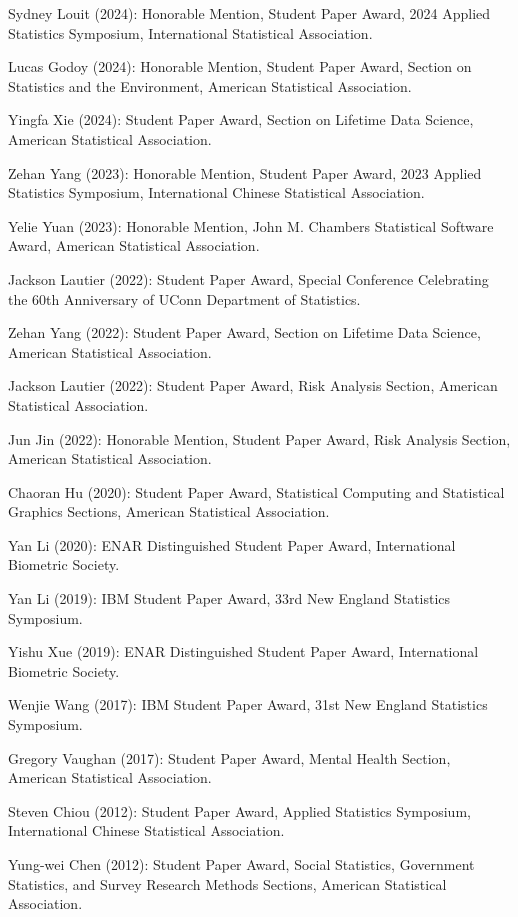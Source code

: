 \documentclass[Statistics]{vita}
\begin{document}
\begin{vita}
\begin{TeachingAccomplishments}
\begin{StudentAwards}
    \item Sydney Louit (2024): Honorable Mention, Student Paper Award, 2024 Applied Statistics Symposium, International Statistical Association.
    \item Lucas Godoy (2024): Honorable Mention, Student Paper Award, Section on Statistics and the Environment, American Statistical Association.
    \item Yingfa Xie (2024): Student Paper Award, Section on Lifetime Data Science, American Statistical Association.
    \item Zehan Yang (2023): Honorable Mention, Student Paper Award, 2023 Applied Statistics Symposium, International Chinese Statistical Association.
    \item Yelie Yuan (2023): Honorable Mention, John M. Chambers Statistical Software Award, American Statistical Association.
    \item Jackson Lautier (2022): Student Paper Award, Special Conference Celebrating the 60th Anniversary of UConn Department of Statistics.
    \item Zehan Yang (2022): Student Paper Award, Section on Lifetime Data Science, American Statistical Association.
    \item Jackson Lautier (2022): Student Paper Award, Risk Analysis Section, American Statistical Association.
    \item Jun Jin (2022): Honorable Mention, Student Paper Award, Risk Analysis Section, American Statistical Association.
    \item Chaoran Hu (2020): Student Paper Award, Statistical Computing and Statistical Graphics Sections, American Statistical Association.
    \item Yan Li (2020): ENAR Distinguished Student Paper Award, International Biometric Society.
    \item Yan Li (2019): IBM Student Paper Award, 33rd New England Statistics Symposium.
    \item Yishu Xue (2019): ENAR Distinguished Student Paper Award, International Biometric Society.
    \item Wenjie Wang (2017): IBM Student Paper Award, 31st New England Statistics Symposium.
    \item Gregory Vaughan (2017): Student Paper Award, Mental Health Section, American Statistical Association.
    \item Steven Chiou (2012): Student Paper Award, Applied Statistics Symposium, International Chinese Statistical Association.
    \item Yung-wei Chen (2012): Student Paper Award,  Social Statistics, Government Statistics, and Survey Research Methods Sections,  American Statistical Association.

\end{StudentAwards}
\end{TeachingAccomplishments}
\end{vita}
\end{document}
